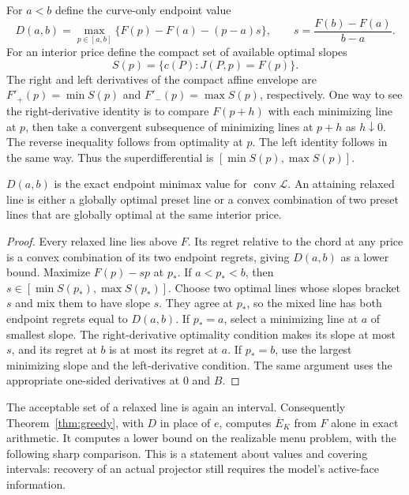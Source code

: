 For $a<b$ define the curve-only endpoint value
\begin{equation}\label{eq:curveoracle}
 D(a,b)=\max_{p\in[a,b]}
 \{F(p)-F(a)-(p-a)s\},\qquad s=\frac{F(b)-F(a)}{b-a}.
\end{equation}
For an interior price define the compact set of available optimal slopes
\begin{equation}\label{eq:slopeset}
 S(p)=\{c(P):J(P,p)=F(p)\}.
\end{equation}
The right and left derivatives of the compact affine envelope are
$F'_+(p)=\min S(p)$ and $F'_-(p)=\max S(p)$, respectively. One way to
see the right-derivative identity is to compare $F(p+h)$ with each
minimizing line at $p$, then take a convergent subsequence of minimizing
lines at $p+h$ as $h\downarrow0$. The reverse inequality follows from
optimality at $p$. The left identity follows in the same way. Thus the
superdifferential is $[\min S(p),\max S(p)]$.

\begin{lemma}\label{lem:relaxation}
$D(a,b)$ is the exact endpoint minimax value for
$\operatorname{conv}\mathcal L$. An attaining relaxed line is either a
globally optimal preset line or a convex combination of two preset lines
that are globally optimal at the same interior price.
\end{lemma}
\begin{proof}
Every relaxed line lies above $F$. Its regret relative to the chord at
any price is a convex combination of its two endpoint regrets, giving
$D(a,b)$ as a lower bound. Maximize $F(p)-sp$ at $p_*$. If
$a<p_*<b$, then $s\in[\min S(p_*),\max S(p_*)]$. Choose two optimal
lines whose slopes bracket $s$ and mix them to have slope $s$. They agree
at $p_*$, so the mixed line has both endpoint regrets equal to $D(a,b)$.
If $p_*=a$, select a minimizing line at $a$ of smallest slope. The
right-derivative optimality condition makes its slope at most $s$, and
its regret at $b$ is at most its regret at $a$. If $p_*=b$, use the
largest minimizing slope and the left-derivative condition. The same
argument uses the appropriate one-sided derivatives at $0$ and $B$.
\end{proof}

The acceptable set of a relaxed line is again an interval. Consequently
Theorem~\ref{thm:greedy}, with $D$ in place of $e$, computes
$\overline E_K$ from $F$ alone in exact arithmetic. It computes a lower
bound on the realizable menu problem, with the following sharp comparison.
This is a statement about values and covering intervals: recovery of an
actual projector still requires the model's active-face information.

